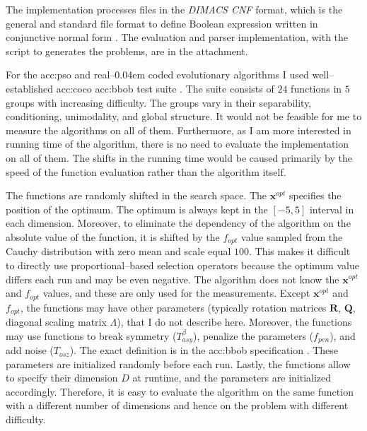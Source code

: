 The implementation processes files in the \textit{DIMACS CNF} format, which is the general and standard file format to define Boolean expression written in conjunctive normal form \citep{challenge1993satisfiability}. The evaluation and parser implementation, with the script to generates the problems, are in the attachment.

For the \acrlong{acc:pso} and real--\kern0.04em coded evolutionary algorithms I used well--established \acrfull{acc:coco} \acrfull{acc:bbob} test suite \citep{hansen2010comparing}. The suite consists of $24$ functions in $5$ groups with increasing difficulty. The groups vary in their separability, conditioning, unimodality, and global structure. It would not be feasible for me to measure the algorithms on all of them. Furthermore, as I am more interested in running time of the algorithm, there is no need to evaluate the implementation on all of them. The shifts in the running time would be caused primarily by the speed of the function evaluation rather than the algorithm itself.

The functions are randomly shifted in the search space. The $\mathbf{x}^{opt}$ specifies the position of the optimum. The optimum is always kept in the $\left[-5,5\right]$ interval in each dimension. Moreover, to eliminate the dependency of the algorithm on the absolute value of the function, it is shifted by the $f_{opt}$ value sampled from the Cauchy distribution with zero mean and scale equal $100$. This makes it difficult to directly use proportional--based selection operators because the optimum value differs each run and may be even negative. The algorithm does not know the $\mathbf{x}^{opt}$ and $f_{opt}$ values, and these are only used for the measurements. Except $\mathbf{x}^{opt}$ and $f_{opt}$, the functions may have other parameters (typically rotation matrices $\mathbf{R}$, $\mathbf{Q}$, diagonal scaling matrix $\Lambda$), that I do not describe here. Moreover, the functions may use functions to break symmetry ($T_{asy}^\beta$), penalize the parameters ($f_{pen}$), and add noise ($T_{osz}$). The exact definition is in the \acrshort{acc:bbob} specification \citep{hansen2010comparing}. These parameters are initialized randomly before each run. Lastly, the functions allow to specify their dimension $D$ at runtime, and the parameters are initialized accordingly. Therefore, it is easy to evaluate the algorithm on the same function with a different number of dimensions and hence on the problem with different difficulty.

